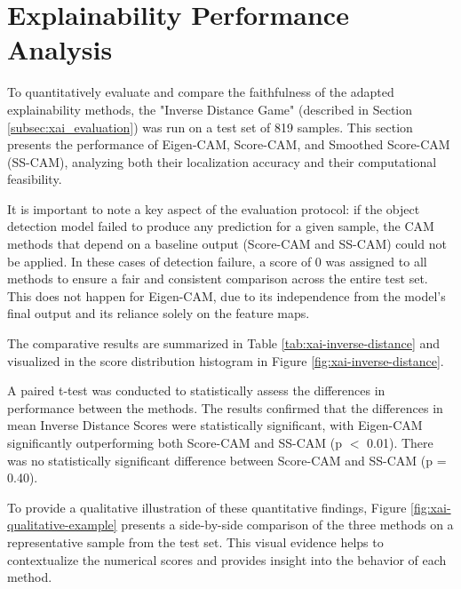 \section{Explainability Performance Analysis}

To quantitatively evaluate and compare the faithfulness of the adapted explainability methods, the "Inverse Distance Game" (described in Section \ref{subsec:xai_evaluation}) was run on a test set of 819 samples. This section presents the performance of Eigen-CAM, Score-CAM, and Smoothed Score-CAM (SS-CAM), analyzing both their localization accuracy and their computational feasibility.

It is important to note a key aspect of the evaluation protocol: if the object detection model failed to produce any prediction for a given sample, the CAM methods that depend on a baseline output (Score-CAM and SS-CAM) could not be applied. In these cases of detection failure, a score of 0 was assigned to all methods to ensure a fair and consistent comparison across the entire test set. This does not happen for Eigen-CAM, due to its independence from the model's final output and its reliance solely on the feature maps.

The comparative results are summarized in Table \ref{tab:xai-inverse-distance} and visualized in the score distribution histogram in Figure \ref{fig:xai-inverse-distance}.





A paired t-test was conducted to statistically assess the differences in performance between the methods. The results confirmed that the differences in mean Inverse Distance Scores were statistically significant, with Eigen-CAM significantly outperforming both Score-CAM and SS-CAM (p $<$ 0.01). There was no statistically significant difference between Score-CAM and SS-CAM (p = 0.40).

To provide a qualitative illustration of these quantitative findings, Figure \ref{fig:xai-qualitative-example} presents a side-by-side comparison of the three methods on a representative sample from the test set. This visual evidence helps to contextualize the numerical scores and provides insight into the behavior of each method.


